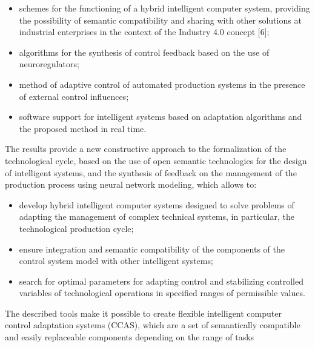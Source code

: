 \documentclass{article}
\begin{document}
\fontsize{10}{14}\selectfont%
\begin{multicols}{2}
\begin{itemize}
    \item schemes for the functioning of a hybrid intelligent
computer system, providing the possibility of semantic compatibility and sharing with other solutions at
industrial enterprises in the context of the Industry
4.0 concept [6];\vspace{-5pt}
\item algorithms for the synthesis of control feedback
based on the use of neuroregulators;\vspace{-5pt}
\item method of adaptive control of automated production
systems in the presence of external control influences;\vspace{-5pt}
\item software support for intelligent systems based on
adaptation algorithms and the proposed method in
real time.
\end{itemize}\vspace{-7pt}\par
The results provide a new constructive approach to
the formalization of the technological cycle, based on
the use of open semantic technologies for the design
of intelligent systems, and the synthesis of feedback on
the management of the production process using neural
network modeling, which allows to:
\begin{itemize}
\item develop hybrid intelligent computer systems designed to solve problems of adapting the management of complex technical systems, in particular, the
technological production cycle;\vspace{-5pt}
\item ensure integration and semantic compatibility of the
components of the control system model with other
intelligent systems;\vspace{-5pt}
\item search for optimal parameters for adapting control
and stabilizing controlled variables of technological
operations in specified ranges of permissible values.
\end{itemize}\par\vspace{-7pt}
The described tools make it possible to create flexible
intelligent computer control adaptation systems (CCAS),
which are a set of semantically compatible and easily
replaceable components depending on the range of tasks

\end{multicols}
\end{document}
